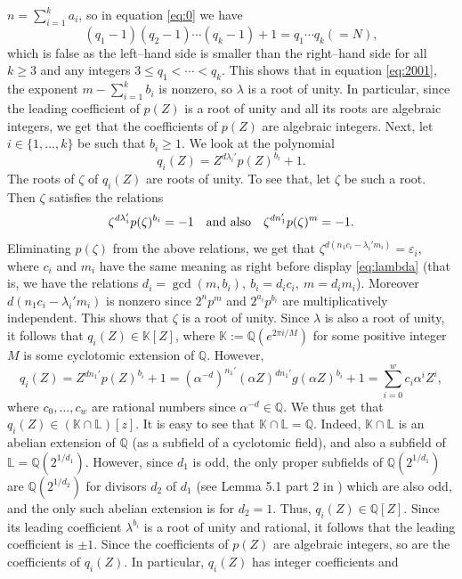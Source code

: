 \documentclass[11pt]{article}
\begin{document}
$n=\sum_{i=1}^k a_i$, so in equation \eqref{eq:0} we have 
$$
(q_1-1)(q_2-1)\cdots (q_k-1)+1=q_1\cdots q_k(=N),
$$
which is false as the left--hand side is smaller than the right--hand side for all $k\ge 3$ and any integers $3\le q_1<\cdots<q_k$. This shows that in equation \eqref{eq:2001}, the exponent 
$m-\sum_{i=1}^k b_i$ is nonzero, so $\lambda$ is a root of unity. In particular, since the leading coefficient of $p(Z)$ is a root of unity and all its roots are algebraic integers, 
we get that the coefficients of $p(Z)$ are algebraic integers. Next, let $i\in \{1,\ldots,k\}$ be such that $b_i\ge 1$. We look at the polynomial 
$$
q_i(Z)=Z^{d\lambda_i'}p(Z)^{b_i}+1.
$$
The roots of $\zeta$ of $q_i(Z)$ are roots of unity. To see that, let $\zeta$ be such a root. Then $\zeta$ satisfies the relations
$$
\zeta^{d\lambda_i'} p(\zeta)^{b_i}=-1\quad {\text{\rm and also}}\quad \zeta^{dn_1'}p(\zeta)^{m}=-1.
$$
Eliminating $p(\zeta)$ from the above relations, we get that $\zeta^{d(n_1c_i-\lambda_i'm_i)}=\varepsilon_i$, where $c_i$ and $m_i$ have the same meaning as right before display  \eqref{eq:lambda} (that is, we have the relations $d_i=\gcd(m,b_i),~b_i=d_ic_i,~m=d_im_i$).  Moreover $d(n_1c_i-\lambda_i'm_i)$ is nonzero since $2^{n}p^m$ and $2^{a_i}p^{b_i}$ are multiplicatively independent.  This shows that $\zeta$ is a root of unity.
Since $\lambda$ is also a root of unity, it follows that $q_i(Z)\in {\mathbb K}[Z]$, where ${\mathbb K}:={\mathbb Q}(e^{2\pi i/M})$ for some positive integer $M$ is some cyclotomic extension of 
${\mathbb Q}$. However, 
\begin{equation}
\label{eq:5000}
q_i(Z)=Z^{dn_1'} p(Z)^{b_i}+1=(\alpha^{-d})^{n_1'} (\alpha Z)^{dn_1'}g(\alpha Z)^{b_i}+1=\sum_{i=0}^w c_i \alpha^i Z^i,
\end{equation}
where $c_0,\ldots,c_w$ are rational numbers since $\alpha^{-d}\in {\mathbb Q}$. We thus get that $q_i(Z)\in ({\mathbb K}\cap {\mathbb L})[z]$. It is easy to see that ${\mathbb K}\cap {\mathbb L}={\mathbb Q}$. Indeed, ${\mathbb K}\cap {\mathbb L}$ is an abelian extension of ${\mathbb Q}$ (as a subfield of a cyclotomic field), and also a subfield of ${\mathbb L}={\mathbb Q}(2^{1/d_1})$. However, since $d_1$ is odd, the only proper subfields of ${\mathbb Q}(2^{1/d_1})$ are ${\mathbb Q}(2^{1/d_2})$ for divisors $d_2$ of $d_1$ (see Lemma 5.1 part 2 in \cite{BMM}) which are also odd,  and the only such abelian extension is for $d_2=1$. Thus, $q_i(Z)\in {\mathbb Q}[Z]$. Since its leading coefficient $\lambda^{b_i}$ is a root of unity and rational, 
it follows that the leading coefficient is $\pm 1$. Since the coefficients of $p(Z)$ are algebraic integers, so are the coefficients of $q_i(Z)$. In particular, $q_i(Z)$ has integer coefficients and 
\end{document}
